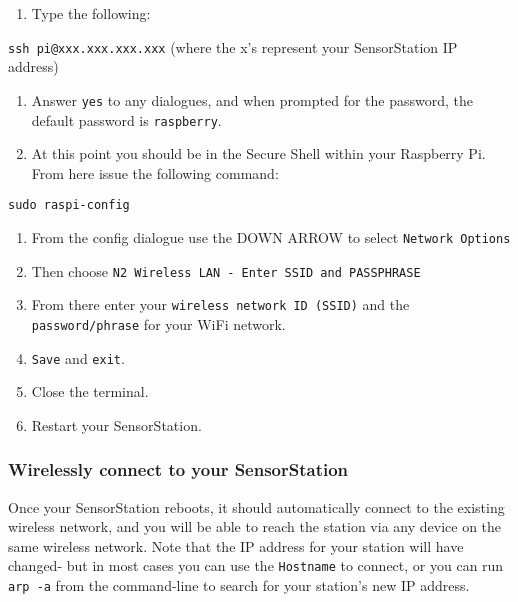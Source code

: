 \documentclass[
]{article}
\providecommand{\tightlist}{%
  \setlength{\itemsep}{0pt}\setlength{\parskip}{0pt}}
\begin{document}
\begin{enumerate}
\def\labelenumi{\arabic{enumi}.}
\setcounter{enumi}{4}
\tightlist
\item
  Type the following:
\end{enumerate}

\texttt{ssh\ pi@xxx.xxx.xxx.xxx} (where the x's represent your
SensorStation IP address)

\begin{enumerate}
\def\labelenumi{\arabic{enumi}.}
\setcounter{enumi}{5}
\item
  Answer \texttt{yes} to any dialogues, and when prompted for the
  password, the default password is \texttt{raspberry}.
\item
  At this point you should be in the Secure Shell within your Raspberry
  Pi. From here issue the following command:
\end{enumerate}

\texttt{sudo\ raspi-config}

\begin{enumerate}
\def\labelenumi{\arabic{enumi}.}
\setcounter{enumi}{7}
\item
  From the config dialogue use the DOWN ARROW to select
  \texttt{Network\ Options}
\item
  Then choose
  \texttt{N2\ Wireless\ LAN\ -\ Enter\ SSID\ and\ PASSPHRASE}
\item
  From there enter your \texttt{wireless\ network\ ID\ (SSID)} and the
  \texttt{password/phrase} for your WiFi network.
\item
  \texttt{Save} and \texttt{exit}.
\item
  Close the terminal.
\item
  Restart your SensorStation.
\end{enumerate}

\hypertarget{wirelessly-connect-to-your-sensorstation}{%
\subsubsection{Wirelessly connect to your
SensorStation}\label{wirelessly-connect-to-your-sensorstation}}

Once your SensorStation reboots, it should automatically connect to the
existing wireless network, and you will be able to reach the station via
any device on the same wireless network. Note that the IP address for
your station will have changed- but in most cases you can use the
\texttt{Hostname} to connect, or you can run \texttt{arp\ -a} from the
command-line to search for your station's new IP address.
\end{document}

